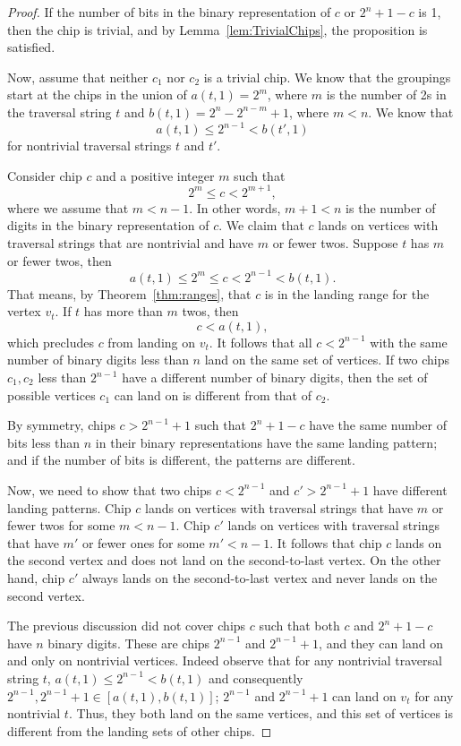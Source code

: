 \documentclass[11pt]{article}
\theoremstyle{definition}
\theoremstyle{remark}
\begin{document}
\begin{proof}
If the number of bits in the binary representation of $c$ or $2^n +1 - c$ is 1, then the chip is trivial, and by Lemma~\ref{lem:TrivialChips}, the proposition is satisfied.

Now, assume that neither $c_1$ nor $ c_2$ is a trivial chip. We know that the groupings start at the chips in the union of $a(t,1) = 2^m$, where $m$ is the number of 2s in the traversal string $t$ and $b(t,1) = 2^n - 2^{n-m} +1$, where $m < n$. We know that
    \[a(t,1) \leq 2^{n-1} < b(t',1)\]
    for nontrivial traversal strings $t$ and $t'$.

    Consider chip $c$ and a positive integer $m$ such that
    \[2^m \leq c < 2^{m+1},\]
    where we assume that $m < n-1$. In other words, $m+1 < n$ is the number of digits in the binary representation of $c$. We claim that $c$ lands on vertices with traversal strings that are nontrivial and have $m$ or fewer twos. Suppose $t$ has $m$ or fewer twos, then
    \[a(t,1) \leq 2^m \leq c < 2^{n-1} < b(t, 1).\]
    That means, by Theorem~\ref{thm:ranges}, that $c$ is in the landing range for the vertex $v_t$. If $t$ has more than $m$ twos, then
    \[ c < a(t,1),\]
    which precludes $c$ from landing on $v_t$. It follows that all $c < 2^{n-1}$ with the same number of binary digits less than $n$ land on the same set of vertices. If two chips $c_1, c_2$ less than $2^{n-1}$ have a different number of binary digits, then the set of possible vertices $c_1$ can land on is different from that of $c_2$.

    By symmetry, chips $c > 2^{n-1} + 1$ such that $2^n+1-c$ have the same number of bits less than $n$ in their binary representations have the same landing pattern; and if the number of bits is different, the patterns are different.

    Now, we need to show that two chips $c < 2^{n-1}$ and $c' > 2^{n-1} + 1$ have different landing patterns. Chip $c$ lands on vertices with traversal strings that have $m$ or fewer twos for some $m < n-1$. Chip $c'$ lands on vertices with traversal strings that have $m'$ or fewer ones for some $m' < n-1$. It follows that chip $c$ lands on the second vertex and does not land on the second-to-last vertex. On the other hand, chip $c'$ always lands on the second-to-last vertex and never lands on the second vertex.
    
    The previous discussion did not cover chips $c$ such that both $c$ and $2^n + 1 -c$ have $n$ binary digits. These are chips $2^{n-1}$ and $2^{n-1}+1$, and they can land on and only on nontrivial vertices. Indeed observe that for any nontrivial traversal string $t$, $a(t, 1) \leq 2^{n-1} < b(t, 1)$ and consequently $2^{n-1}, 2^{n-1}+1 \in [a(t, 1), b(t, 1)]$; $2^{n-1}$ and $2^{n-1}+1$ can land on $v_t$ for any nontrivial $t$. Thus, they both land on the same vertices, and this set of vertices is different from the landing sets of other chips.
\end{proof}
\end{document}
